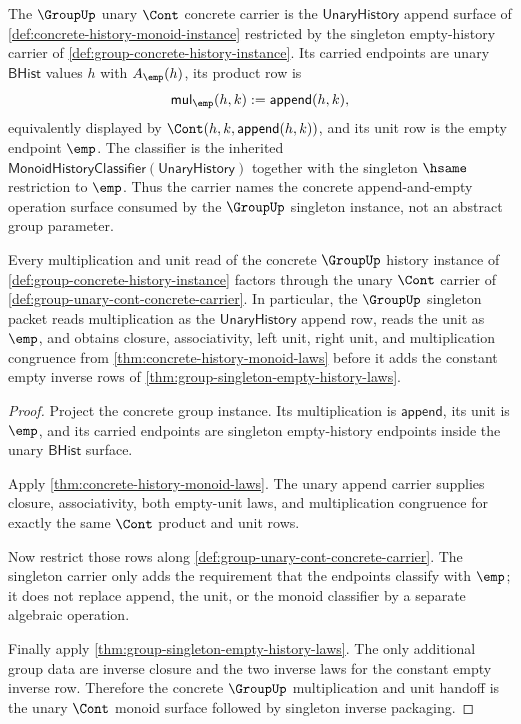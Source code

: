 \begin{definition}
\label{def:group-unary-cont-concrete-carrier}
The $\GroupUp$ unary $\Cont$ concrete carrier is the $\mathsf{UnaryHistory}$
append surface of \autoref{def:concrete-history-monoid-instance} restricted by
the singleton empty-history carrier of
\autoref{def:group-concrete-history-instance}. Its carried endpoints are
unary $\mathsf{BHist}$ values $h$ with $A_{\emp}(h)$, its product row is
$$
\mathsf{mul}_{\emp}(h,k):=\mathsf{append}(h,k),
$$
equivalently displayed by $\Cont(h,k,\mathsf{append}(h,k))$, and its unit row
is the empty endpoint $\emp$. The classifier is the inherited
$\mathsf{MonoidHistoryClassifier}(\mathsf{UnaryHistory})$ together with the
singleton $\hsame$ restriction to $\emp$. Thus the carrier names the concrete
append-and-empty operation surface consumed by the $\GroupUp$ singleton
instance, not an abstract group parameter.
\end{definition}

\begin{theorem}
\label{thm:group-unary-cont-concrete-monoid}
Every multiplication and unit read of the concrete $\GroupUp$ history instance
of \autoref{def:group-concrete-history-instance} factors through the unary
$\Cont$ carrier of \autoref{def:group-unary-cont-concrete-carrier}. In
particular, the $\GroupUp$ singleton packet reads multiplication as the
$\mathsf{UnaryHistory}$ append row, reads the unit as $\emp$, and obtains
closure, associativity, left unit, right unit, and multiplication congruence
from \autoref{thm:concrete-history-monoid-laws} before it adds the constant
empty inverse rows of \autoref{thm:group-singleton-empty-history-laws}.
\end{theorem}
\begin{proof}
Project the concrete group instance. Its multiplication is
$\mathsf{append}$, its unit is $\emp$, and its carried endpoints are singleton
empty-history endpoints inside the unary $\mathsf{BHist}$ surface.

Apply \autoref{thm:concrete-history-monoid-laws}. The unary append carrier
supplies closure, associativity, both empty-unit laws, and multiplication
congruence for exactly the same $\Cont$ product and unit rows.

Now restrict those rows along
\autoref{def:group-unary-cont-concrete-carrier}. The singleton carrier only
adds the requirement that the endpoints classify with $\emp$; it does not
replace append, the unit, or the monoid classifier by a separate algebraic
operation.

Finally apply \autoref{thm:group-singleton-empty-history-laws}. The only
additional group data are inverse closure and the two inverse laws for the
constant empty inverse row. Therefore the concrete $\GroupUp$ multiplication
and unit handoff is the unary $\Cont$ monoid surface followed by singleton
inverse packaging.
\end{proof}

